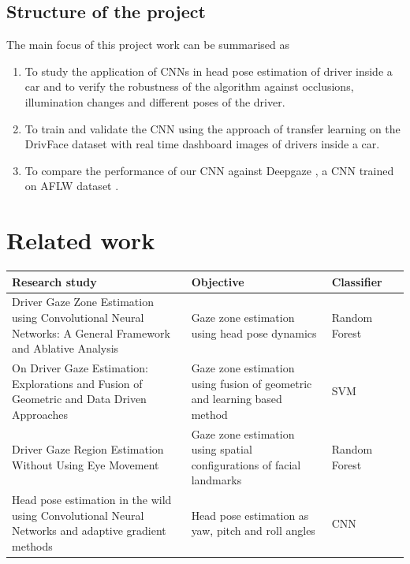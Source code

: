 \documentclass[a4paper, 12pt, oneside, BCOR1cm,toc=chapterentrywithdots]{scrbook}
\begin{document}
\section{Structure of the project}
The main focus of this project work can be summarised as

\begin{enumerate}
	\item To study the application of CNNs in head pose estimation of driver inside a car and to verify the robustness of the algorithm against occlusions, illumination changes and different poses of the driver.
	\item To train and validate the CNN using the approach of transfer learning on the DrivFace \cite{noauthor_uci_nodate} dataset with real time dashboard images of drivers inside a car.
	\item To compare the performance of our CNN against Deepgaze \cite{noauthor_head_nodate} , a CNN trained on AFLW dataset \cite{noauthor_icg_nodate} .
	
\end{enumerate}




\chapter{Related work}
\begin{center}
\begin{tabular}{| p{5cm}| p{5cm}  | l | l |}
\hline
Research study & Objective & Classifier\\
\hline
Driver Gaze Zone Estimation using Convolutional Neural Networks:
A General Framework and Ablative Analysis \cite{vora_driver_2018} & Gaze zone estimation
using head pose dynamics & Random Forest\\
\hline
On Driver Gaze Estimation: Explorations and Fusion of Geometric and
Data Driven Approaches \cite{noauthor_driver_nodate} & Gaze zone estimation using fusion of geometric and learning based  method & SVM\\ 
\hline
Driver Gaze Region Estimation Without Using Eye Movement \cite{noauthor_[1507.04760]_nodate} & Gaze zone estimation
using spatial configurations of facial landmarks & Random Forest\\
\hline
Head pose estimation in the wild using Convolutional Neural Networks and adaptive gradient methods \cite{noauthor_head_nodate}  & Head pose estimation as yaw, pitch and roll angles & CNN\\
\hline
\end{tabular}
\label{tab:table1}
\end{center}
\end{document}
